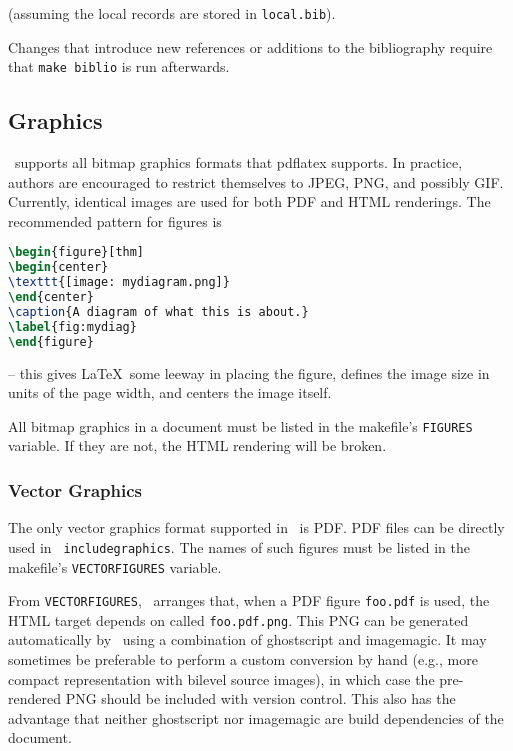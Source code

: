 \documentclass[11pt,a4paper]{ivoa}
\newcommand{\texword}[1]{\texttt{\color{texcolor} #1}}
\begin{document}
\begin{lstlisting}[language=tex]

\end{lstlisting}

(assuming the local records are stored in \texttt{local.bib}).

Changes that introduce new references or additions to the bibliography
require that \texttt{make biblio} is run afterwards.

\subsection{Graphics}

\ivoatex\ supports all bitmap graphics formats that pdflatex supports.
In practice, authors are encouraged to restrict themselves to JPEG, PNG,
and possibly GIF.  Currently, identical images are used for both PDF and
HTML renderings.  The recommended pattern for figures is

\begin{lstlisting}[language=tex]
\begin{figure}[thm]
\begin{center}
\texttt{[image: mydiagram.png]}
\end{center}
\caption{A diagram of what this is about.}
\label{fig:mydiag}
\end{figure}
\end{lstlisting}

-- this gives \LaTeX\ some leeway in placing the figure, defines the image
size in units of the page width, and centers the image itself.

All bitmap graphics in a document must  be listed in the makefile's
\texttt{FIGURES} variable.  If they are not, the HTML rendering will be
broken.

\subsubsection{Vector Graphics}
\label{sect:vectorgraphics}

The only vector graphics format supported in \ivoatex\ is PDF.  PDF
files can be directly used in \texword{includegraphics}.  The names of
such figures must be listed in the makefile's \texttt{VECTORFIGURES}
variable.

From \texttt{VECTORFIGURES}, \ivoatex\ arranges that, when a PDF figure 
\texttt{foo.pdf} is used, the HTML target depends on called
\texttt{foo.pdf.png}.  This PNG can be generated automatically by
\ivoatex\ using a combination of ghostscript and imagemagic.  It may
sometimes be preferable to perform a custom conversion by hand (e.g.,
more compact representation with bilevel source images), in which case
the pre-rendered PNG should be included with version control.  This also
has the advantage that neither ghostscript nor imagemagic are build
dependencies of the document.
\end{document}
